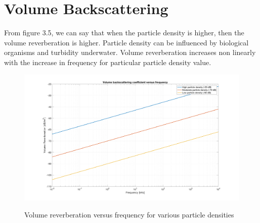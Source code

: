 \newpage

\section{ Volume Backscattering } \label{ Volume Backscattering } 
\noindent From figure 3.5, we can say that when the particle density is higher, then the volume reverberation is higher. Particle density can be influenced by biological organisms and turbidity underwater. Volume reverberation increases non linearly with the increase in frequency for particular particle density value. 

\begin{figure}[H]
\centering
{\includegraphics[scale=0.18]{usp3_5.png}}
\caption{Volume reverberation versus frequency for various particle densities}
\end{figure}



